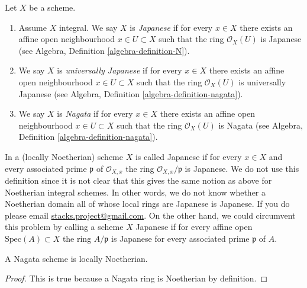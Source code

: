 \begin{definition}
\label{definition-nagata}
Let $X$ be a scheme.
\begin{enumerate}
\item Assume $X$ integral. We say $X$ is {\it Japanese}
if for every $x \in X$ there exists an
affine open neighbourhood $x \in U \subset X$ such that the ring
$\mathcal{O}_X(U)$ is Japanese (see
Algebra, Definition \ref{algebra-definition-N}).
\item We say $X$ is {\it universally Japanese} if for every $x \in X$
there exists an affine open neighbourhood $x \in U \subset X$ such that
the ring $\mathcal{O}_X(U)$ is universally Japanese (see
Algebra, Definition \ref{algebra-definition-nagata}).
\item We say $X$ is {\it Nagata} if for every $x \in X$ there exists an
affine open neighbourhood $x \in U \subset X$ such that the ring
$\mathcal{O}_X(U)$ is Nagata (see
Algebra, Definition \ref{algebra-definition-nagata}).
\end{enumerate}
\end{definition}

\begin{remark}
\label{remark-non-integral-Japanese}
In \cite{Hoobler-finite} a (locally Noetherian) scheme $X$ is called
Japanese if for every $x \in X$ and every associated prime $\mathfrak p$
of $\mathcal{O}_{X, x}$ the ring $\mathcal{O}_{X, x}/\mathfrak p$ is
Japanese. We do not use this definition since it is not clear
that this gives the same notion as above for Noetherian integral schemes.
In other words, we do not know whether a Noetherian domain all
of whose local rings are Japanese is Japanese. If you do please
email \href{mailto:stacks.project@gmail.com}{stacks.project@gmail.com}.
On the other hand, we could circumvent this problem by calling a scheme
$X$ Japanese if for every affine open $\text{Spec}(A) \subset X$ the ring
$A/\mathfrak p$ is Japanese for every associated prime $\mathfrak p$ of $A$.
\end{remark}

\begin{lemma}
\label{lemma-nagata-locally-Noetherian}
A Nagata scheme is locally Noetherian.
\end{lemma}

\begin{proof}
This is true because a Nagata ring is Noetherian by definition.
\end{proof}


